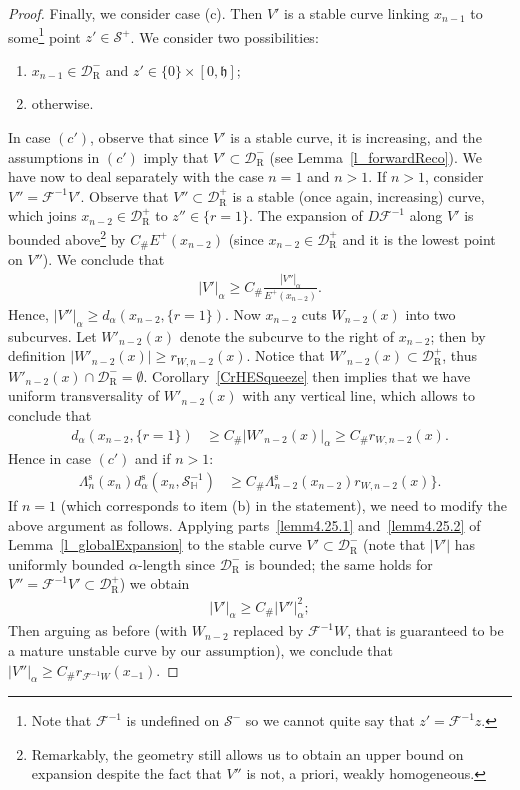 \documentclass[AHL, Unicode, longabstracts,published]{cedram}
\newcommand{\ct}{r}
\newcommand{\const}{C_\#}
\newcommand{\inv}{^{-1}}
\newcommand{\stable}{\text{s}}
\newcommand{\homo}{\mathbb{H}}
\newcommand{\cm}{\mathcal{F}}
\newcommand{\cell}{\mathcal{D}}
\newcommand{\slopeb}{\mathfrak{h}}
\newcommand{\recoPrivate}{\mathrm{R}}
\newcommand{\reco}{{\cell^-_{\recoPrivate}}}
\newcommand{\backReco}{{\cell^+_{\recoPrivate}}}
\newcommand{\dadm}[1]{\dadmPrivate^{#1}}
\newcommand{\dadmPrivate}{d\adm}
\newcommand{\ds}{\dadmPrivate^{\stable}}
\newcommand{\singPrivate}{\mathcal{S}}
\newcommand{\hsing}[1]{{\singPrivate}_\homo^{#1}}
\newcommand{\singForward}[1]{\singPrivate^+_{#1}}
\newcommand{\singBackward}[1]{\singPrivate^-_{#1}}
\newcommand{\adm}{_{\alpha^{+}}}
\newcommand{\admName}{\alpha^{+}}
\renewcommand{\admName}{\alpha}
\renewcommand{\adm}{_{\alpha}}
\renewcommand{\dadm}{d\adm}
\begin{document}
\begin{proof}
Finally, we consider case (c). Then $V'$ is a stable curve linking $x_{n-1}$ to some\footnote{ Note that $\cm\inv$ is undefined on $\singBackward{}$ so we cannot quite say that $z' = \cm\inv z$.} point $z'\in\singForward{}$. We consider two possibilities:
\begin{enumerate}
\item[$(c')$] $x_{n-1}\in\reco$ and $z'\in\{0\}\times[0,\slopeb]$;
\item[$(c'')$] otherwise.
\end{enumerate}
In case $(c')$, observe that since $V'$ is a stable curve, it is increasing, and the assumptions in $(c')$ imply that $V'\subset\reco$ (see Lemma~\ref{l_forwardReco}). We have now to deal separately with the case $n = 1$ and $n > 1$. If $n > 1$, consider $V'' = \cm\inv V'$. Observe that $V''\subset\backReco$ is a stable (once again, increasing) curve, which joins $x_{n-2}\in\backReco$ to $z''\in\{\ct = 1\}$. The expansion of $D\cm\inv$ along $V'$ is bounded above\footnote{ Remarkably, the geometry still allows us to obtain an upper bound on expansion despite the fact that $V''$ is not, a priori, weakly homogeneous.} by $\const E^{+}(x_{n-2})$ (since $x_{n-2}\in\backReco$ and it is the lowest point on $V''$). We conclude that
\begin{align*}
|V'|\adm\ge \const \frac{|V''|\adm}{E^{+}(x_{n-2})}.
\end{align*}
Hence, $|V''|\adm\ge \dadm(x_{n-2},\{\ct = 1\})$. Now $x_{n-2}$ cuts $W_{n-2}(x)$ into two subcurves. Let $W'_{n-2}(x)$ denote the subcurve to the right of $x_{n-2}$; then by definition $|W'_{n-2}(x)|\ge r_{W,n-2}(x)$. Notice that $W'_{n-2}(x)\subset\backReco$, thus $W'_{n-2}(x)\cap\reco = \emptyset$. Corollary~\ref{CrHESqueeze} then implies that we have uniform transversality of $W'_{n-2}(x)$ with any vertical line, which allows to conclude that
\begin{align*}
\dadm{}(x_{n-2},\{\ct = 1\}) &\ge \const |W'_{n-2}(x)|\adm\ge \const r_{W,n-2}(x).
\end{align*}
Hence in case $(c')$ and if $n > 1$:
\begin{align*}
\Lambda^{\stable}_{n}(x_{n})\ds(x_{n},\hsing{-1}) &\ge \const
\Lambda^{\stable}_{n-2}(x_{n-2})r_{W,n-2}(x)\}.
\end{align*}
If $n = 1$ (which corresponds to item (b) in the statement), we need to modify the above argument as follows. Applying parts~\eqref{lemm4.25.1} and~\eqref{lemm4.25.2} of Lemma~\ref{l_globalExpansion} to the stable curve $V'\subset\reco$ (note that $|V'|$ has uniformly bounded $\admName{}$-length since $\reco$ is bounded; the same holds for $V'' = \cm\inv V'\subset\backReco$) we obtain
\begin{align*}
|V'|\adm \ge \const |V''|\adm^{2};
\end{align*}
Then arguing as before (with $W_{n-2}$ replaced by $\cm\inv W$, that is guaranteed to be a mature unstable curve by our assumption), we conclude that $|V''|\adm\ge \const r_{\cm\inv W}(x_{-1})$.


\end{proof}
\end{document}
